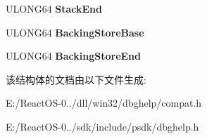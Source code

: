 \begin{DoxyCompactItemize}
U\+L\+O\+N\+G64 {\bfseries Stack\+End}
\item 
\mbox{\label{struct___m_i_n_i_d_u_m_p___t_h_r_e_a_d___e_x___c_a_l_l_b_a_c_k_a8ab324701b5ddaf4900edfcf1a4190e6}} 
U\+L\+O\+N\+G64 {\bfseries Backing\+Store\+Base}
\item 
\mbox{\label{struct___m_i_n_i_d_u_m_p___t_h_r_e_a_d___e_x___c_a_l_l_b_a_c_k_ae20bbc4a32e2534d3bc3b179c2f6de3e}} 
U\+L\+O\+N\+G64 {\bfseries Backing\+Store\+End}
\end{DoxyCompactItemize}


该结构体的文档由以下文件生成\+:\begin{DoxyCompactItemize}
\item 
E\+:/\+React\+O\+S-\/0../dll/win32/dbghelp/compat.\+h\item 
E\+:/\+React\+O\+S-\/0../sdk/include/psdk/dbghelp.\+h\end{DoxyCompactItemize}
